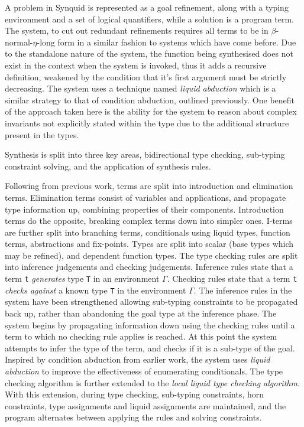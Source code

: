 \documentclass[a4paper]{article}
\begin{document}
A problem in Synquid is represented as a goal refinement, along with a typing environment and a set of logical quantifiers, 
while a solution is a program term. The system, to cut out redundant refinements requires all terms to be in \(\beta\)-normal-\(\eta\)-long 
form in a similar fashion to systems which have come before. Due to the standalone nature of the system, the function 
being synthesised does not exist in the context when the system is invoked, thus it adds a recursive definition, weakened by 
the condition that it's first argument must be strictly decreasing. The system uses a technique named \emph{liquid abduction} which 
is a similar strategy to that of condition abduction, outlined previously. One benefit of the approach taken here is the ability for the system 
to reason about complex invariants not explicitly stated within the type due to the additional structure present in the types.

Synthesis is split into three key areas, bidirectional type checking, sub-typing constraint solving, and the application of synthesis rules.

Following from previous work, terms are split into introduction and elimination terms. Elimination terms consist of 
variables and applications, and propagate type information up, combining properties of their components. Introduction 
terms do the opposite, breaking complex terms down into simpler ones. I-terms are further split into branching terms, 
conditionals using liquid types, function terms, abstractions and fix-points. Types are split into scalar (base types which may be refined),
and dependent function types. The type checking rules are split into inference judgements and checking judgements. 
Inference rules state that a term \texttt{t} \emph{generates} type \texttt{T} in an environment \(\Gamma\). Checking rules state that a term 
\texttt{t} \emph{checks against} a known type \texttt{T} in the environment \(\Gamma\). The inference rules in the system have been strengthened
allowing sub-typing constraints to be propagated back up, rather than abandoning the goal type at the inference phase.
The system begins by propagating information down using the checking rules until a term to which no checking rule
applies is reached. At this point the system attempts to infer the type of the term, and checks if it is a sub-type of the goal.  
Inspired by condition abduction from earlier work, the system uses \emph{liquid abduction} to improve the effectiveness of 
enumerating conditionals. The type checking algorithm is further extended to the \emph{local liquid type checking algorithm}.
With this extension, during type checking, sub-typing constraints, horn constraints, type assignments and liquid assignments 
are maintained, and the program alternates between applying the rules and solving constraints. 
\end{document}
